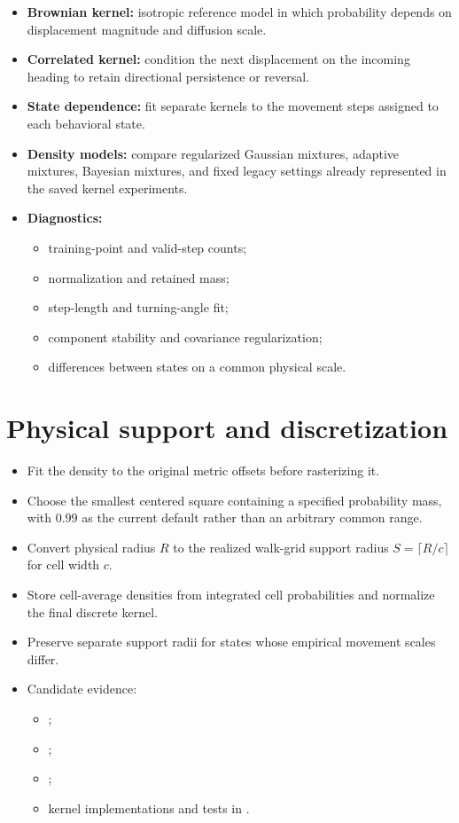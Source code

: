 \begin{itemize}
  \item \textbf{Brownian kernel:} isotropic reference model in which probability depends on displacement magnitude and diffusion scale.
  \item \textbf{Correlated kernel:} condition the next displacement on the incoming heading to retain directional persistence or reversal.
  \item \textbf{State dependence:} fit separate kernels to the movement steps assigned to each behavioral state.
  \item \textbf{Density models:} compare regularized Gaussian mixtures, adaptive mixtures, Bayesian mixtures, and fixed legacy settings already represented in the saved kernel experiments.
  \item \textbf{Diagnostics:}
  \begin{itemize}
    \item training-point and valid-step counts;
    \item normalization and retained mass;
    \item step-length and turning-angle fit;
    \item component stability and covariance regularization;
    \item differences between states on a common physical scale.
  \end{itemize}
\end{itemize}

\section{Physical support and discretization}

\begin{itemize}
  \item Fit the density to the original metric offsets before rasterizing it.
  \item Choose the smallest centered square containing a specified probability mass, with $0.99$ as the current default rather than an arbitrary common range.
  \item Convert physical radius $R$ to the realized walk-grid support radius $S=\lceil R/c\rceil$ for cell width $c$.
  \item Store cell-average densities from integrated cell probabilities and normalize the final discrete kernel.
  \item Preserve separate support radii for states whose empirical movement scales differ.
  \item Candidate evidence:
  \begin{itemize}
    \item {};
    \item {};
    \item {};
    \item kernel implementations and tests in .
  \end{itemize}
\end{itemize}

